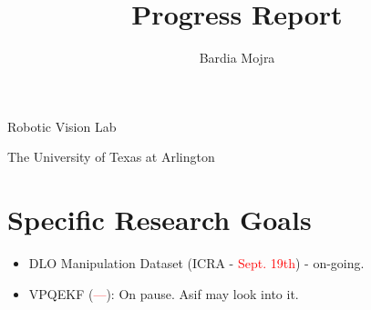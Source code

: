 \documentclass[11pt]{article}
\title{Progress Report}
\author{Bardia Mojra}
\begin{document}
\maketitle
\thispagestyle{empty}

\bigskip
\bigskip
\begin{center}
 Robotic Vision Lab
\end{center}

\begin{center}
The University of Texas at Arlington
\end{center}

\newpage

\section{Specific Research Goals}
\begin{itemize}
  \item DLO Manipulation Dataset (ICRA - \textcolor{red}{Sept. 19th}) - on-going.
  \item VPQEKF (\textcolor{red}{---}): On pause. Asif may look into it.
\end{itemize}
\end{document}
